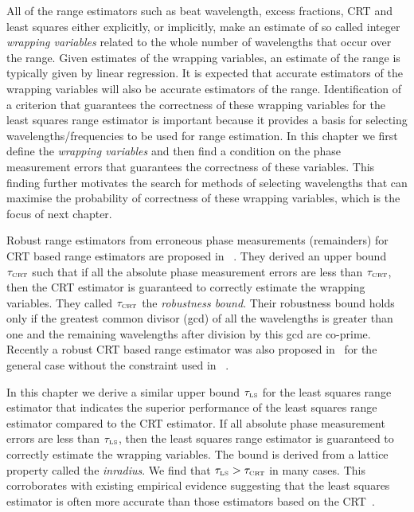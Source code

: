 All of the range estimators such as beat wavelength, excess fractions, CRT and least squares either explicitly, or implicitly, make an estimate of so called integer \emph{wrapping variables} related to the whole number of wavelengths that occur over the range.  Given estimates of the wrapping variables, an estimate of the range is typically given by linear regression.  It is expected that accurate estimators of the wrapping variables will also be accurate estimators of the range. Identification of a criterion that guarantees the correctness of these wrapping variables for the least squares range estimator is important because it provides a basis for selecting wavelengths/frequencies to be used for range estimation. In this chapter we first define the \emph{wrapping variables} and then find a condition on the phase measurement errors that guarantees the correctness of these variables. This finding further motivates the search for methods of selecting wavelengths that can maximise the probability of correctness of these wrapping variables, which is the focus of next chapter.

Robust range estimators from erroneous phase measurements (remainders) for CRT based range estimators are proposed in~\cite{Xiaowei_Li_robust_CRT_2009, W.Wang_closed_form_crt_2010} . They derived an upper bound $\tau_{\text{\tiny{CRT}}}$ such that if all the absolute phase measurement errors are less than $\tau_{\text{\tiny{CRT}}}$, then the CRT estimator is guaranteed to correctly estimate the wrapping variables. They called $\tau_{\text{\tiny{CRT}}}$ the \emph{robustness bound}. Their robustness bound holds only if the greatest common divisor (gcd) of all the wavelengths is greater than one and the remaining wavelengths after division by this gcd are co-prime. Recently a robust CRT based range estimator was also proposed in~\cite{Xiao_multistage_crt_2014} for the general case without the constraint used in ~\cite{Xiaowei_Li_robust_CRT_2009, W.Wang_closed_form_crt_2010}. 

In this chapter we derive a similar upper bound $\tau_{\text{\tiny{LS}}}$ for the least squares range estimator that indicates the superior performance of the least squares range estimator compared to the CRT estimator.  If all absolute phase measurement errors are less than $\tau_{\text{\tiny{LS}}}$, then the least squares range estimator is guaranteed to correctly estimate the wrapping variables.  The bound is derived from a lattice property called the \emph{inradius}.  We find that  $\tau_{\text{\tiny{LS}}} > \tau_{\text{\tiny{CRT}}}$ in many cases.  This corroborates with existing empirical evidence suggesting that the least squares estimator is often more accurate than those estimators based on the CRT~\cite{Akhlaq_basis_construction_range_est_2015}.

